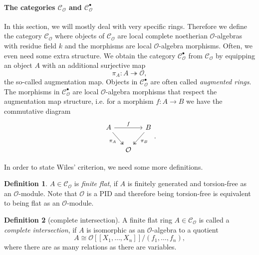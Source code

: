 \documentclass{article}
\theoremstyle{plain}%
\theoremstyle{definition}
\newtheorem{definition}{Definition}[section]
\theoremstyle{remark}
\newcommand{\cob}{\mathcal{C}_\mathcal{O}^\bullet}
\newcommand{\co}{\mathcal{C}_\mathcal{O}}
\begin{document}
    \paragraph{The categories \(\co\) and \(\cob\)}
    In this section, we will mostly deal with very specific rings. Therefore we define the category \(\co\) where objects of \(\co\) are
    local complete noetherian \(\mathcal O\)-algebras with residue field \(k\) and the morphisms are local \(\mathcal{O}\)-algebra morphisms.
    Often, we even need some extra structure. 
    We obtain the category \(\cob\) from \(\co\) by equipping an object \(A\) with an additional surjective map
    \[\pi_A \colon A \twoheadrightarrow \mathcal{O},\]
    the so-called augmentation map. Objects in \(\cob\) are often called \textit{augmented rings}.
    The morphisms in \(\cob\) are local \(\mathcal{O}\)-algebra morphisms that respect the augmentation map structure, i.e. for a morphism
    \(f \colon A \to B\) we have the commutative diagram
    \[
    \begin{tikzcd}[column sep=small]
        A \arrow[rr, "f"] \arrow [dr, "\pi_A", swap, twoheadrightarrow] & & B \arrow [dl, "\pi_B", twoheadrightarrow]\\
        & \mathcal{O} &
    \end{tikzcd}.
    \]

    In order to state Wiles' criterion, we need some more definitions.
    \begin{definition}
        \(A \in \co\) is \textit{finite flat}, if \(A\) is finitely generated and torsion-free as an \(\mathcal{O}\)-module.
        Note that \(\mathcal{O}\) is a PID and therefore being torsion-free is equivalent to being flat as an \(\mathcal{O}\)-module.
    \end{definition}
    
    \begin{definition}[complete intersection]
        A finite flat ring \(A \in \co\) is called a \textit{complete intersection}, if \(A\) is isomorphic as an \(\mathcal{O}\)-algebra
        to a quotient
        \[A \cong \mathcal{O}[[X_1, \dots, X_n]]/(f_1, \dots, f_n),\] where there are as many relations as there are variables.
    \end{definition}
\end{document}
